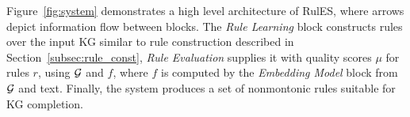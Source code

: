 Figure~\ref{fig:system} demonstrates a high level architecture of RulES, where arrows depict information flow between blocks.
The \emph{Rule Learning} block constructs rules over the input KG similar to rule construction described in Section~\ref{subsec:rule_const}, \emph{Rule Evaluation} supplies it with quality scores $\mu$ for rules $r$, using $\mathcal{G}$ and $f$, where $f$ is computed by the \emph{Embedding Model} block from $\mathcal{G}$ and text. Finally, the system produces a set of nonmontonic rules suitable for KG completion.



 

